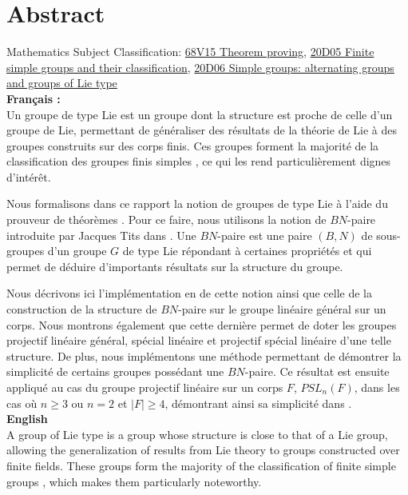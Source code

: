 \section*{Abstract}

Mathematics Subject Classification: \href{https://zbmath.org/classification/?q=cc%3A68V15}{68V15 Theorem proving}, \href{https://zbmath.org/classification/?q=cc%3A20D05}{20D05 Finite simple groups and their classification}, \href{https://zbmath.org/classification/?q=cc%3A20D06}{20D06 Simple groups: alternating groups and groups of Lie type} \\


\textbf{Français : }\\
Un groupe de type Lie est un groupe dont la structure est proche de celle d'un groupe de Lie, permettant de généraliser des résultats de la théorie de Lie à des groupes construits sur des corps finis. Ces groupes forment la majorité de la classification des groupes finis simples \cite{wilson_finite_2009}, ce qui les rend particulièrement dignes d'intérêt.

Nous formalisons dans ce rapport la notion de groupes de type Lie à l'aide du prouveur de théorèmes \Lean. Pour ce faire, nous utilisons la notion de $BN$-paire introduite par Jacques Tits dans \cite{tits_algebraic_1964}. Une $BN$-paire est une paire $\left( B, N \right)$ de sous-groupes d'un groupe $G$ de type Lie répondant à certaines propriétés et qui permet de déduire d'importants résultats sur la structure du groupe.

Nous décrivons ici l'implémentation en \Lean de cette notion ainsi que celle de la construction de la structure de $BN$-paire sur le groupe linéaire général sur un corps. Nous montrons également que cette dernière permet de doter les groupes projectif linéaire général, spécial linéaire et projectif spécial linéaire d'une telle structure. De plus, nous implémentons une méthode permettant de démontrer la simplicité de certains groupes possédant une $BN$-paire. Ce résultat est ensuite appliqué au cas du groupe projectif linéaire sur un corps $F$, $PSL_n(F)$, dans les cas où $n \geq 3$ ou $n = 2$ et $|F| \geq 4$, démontrant ainsi sa simplicité dans \Lean.\\

    \textbf{English}\\

A group of Lie type is a group whose structure is close to that of a Lie group, allowing the generalization of results from Lie theory to groups constructed over finite fields. These groups form the majority of the classification of finite simple groups \cite{wilson_finite_2009}, which makes them particularly noteworthy.

